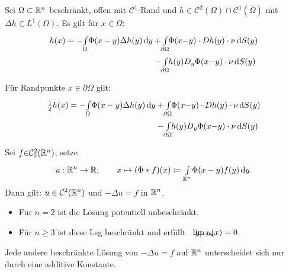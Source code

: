 \documentclass{cheat-sheet}
\begin{document}

\begin{satz}
  Sei $\Omega \subset \mathbb{R}^n$ beschränkt, offen mit $\mathcal{C}^1$-Rand und $h \in \mathcal{C}^2(\Omega) \cap \mathcal{C}^1(\overline{\Omega})$ mit $\Delta h {\in} L^1(\Omega)$. Es gilt für $x {\in} \Omega$:
  \begin{align*}
    h(x) = - \Int{\Omega}{}{\Phi(x-y) \Delta h(y)}{y} &+ \Int{\mathclap{\partial \Omega}}{}{\Phi(x {-} y) \cdot Dh(y) \cdot \nu}{S(y)}\\
    &- \Int{\mathclap{\partial \Omega}}{}{h(y) D_y \Phi(x{-}y) \cdot \nu}{S(y)}
  \end{align*}
\end{satz}

\begin{bem}
  Für Randpunkte $x \in \partial \Omega$ gilt:
  \begin{align*}
    \tfrac{1}{2} h(x) = - \Int{\Omega}{}{\Phi(x-y) \Delta h(y)}{y} &+ \Int{\mathclap{\partial \Omega}}{}{\Phi(x {-} y) \cdot Dh(y) \cdot \nu}{S(y)}\\
    &- \Int{\mathclap{\partial \Omega}}{}{h(y) D_y \Phi(x{-}y) \cdot \nu}{S(y)}
  \end{align*}
\end{bem}


\begin{kor}
  Sei $f {\in} \mathcal{C}_0^2(\mathbb{R}^n)$, setze
  \[ u : \mathbb{R}^n \to \mathbb{R}, \qquad x \mapsto (\Phi * f)(x) \coloneqq {\textstyle \int\limits_{\mathbb{R}^n}^{}} \Phi(x-y) f(y) \,\mathrm{d} y. \]
  Dann gilt: $u \in \mathcal{C}^2(\mathbb{R}^n)$ und $- \Delta u = f$ in $\mathbb{R}^n$.
\end{kor}

\begin{bem}
  \begin{itemize}
    \item Für $n = 2$ ist die Lösung potentiell unbeschränkt.
    \item Für $n \geq 3$ ist diese Lsg beschränkt und erfüllt $\enspace\lim_{\mathclap{\abs{x} \to \infty}} u(x) = 0$.
  \end{itemize}
\end{bem}

\begin{prop}
  Jede andere beschränkte Lösung von $- \Delta u = f$ auf $\mathbb{R}^n$ unterscheidet sich nur durch eine additive Konstante.
\end{prop}
\end{document}
